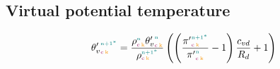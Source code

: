 \clearpage
\subsection{Virtual potential temperature}
\label{sub:virtual_potential_temperature}
\begin{equation}
  \vpotempprime{\n+1^*}{\c}{\k} = \frac{\density{\n}{\c}{\k}\vpotempprime{\n}{\c}{\k}}{\density{\n+1^*}{\c}{\k}} \left( \left( \frac{\exnerprime{\n+1^*}{\c}{\k}}{\exnerprime{\n}{\c}{\k}} -1 \right) \frac{\cvd}{\Rd} +1 \right)
\end{equation}
